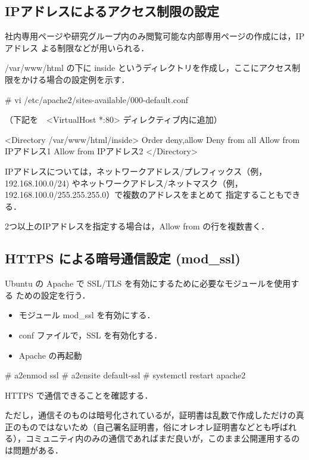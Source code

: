 \subsection{IPアドレスによるアクセス制限の設定}

社内専用ページや研究グループ内のみ閲覧可能な内部専用ページの作成には，IPアドレス
よる制限などが用いられる．

/var/www/html の下に inside というディレクトリを作成し，ここにアクセス制
限をかける場合の設定例を示す．

\begin{cli}
# vi /etc/apache2/sites-available/000-default.conf

（下記を　<VirtualHost *:80> ディレクティブ内に追加）

<Directory /var/www/html/inside>
        Order deny,allow
        Deny from all
        Allow from IPアドレス1
        Allow from IPアドレス2
</Directory>
\end{cli}

IPアドレスについては，ネットワークアドレス/プレフィックス（例，192.168.100.0/24)
やネットワークアドレス/ネットマスク（例，192.168.100.0/255.255.255.0）で複数のアドレスをまとめて
指定することもできる． 

2つ以上のIPアドレスを指定する場合は，Allow from の行を複数書く．




\subsection{HTTPS による暗号通信設定 (mod\_ssl)}

Ubuntu の Apache で SSL/TLS を有効にするために必要なモジュールを使用する
ための設定を行う．

\begin{itemize}
 \item モジュール mod\_ssl を有効にする．
 \item conf ファイルで，SSL を有効化する．
 \item Apache の再起動
\end{itemize}

\begin{cli}
# a2enmod ssl
# a2ensite default-ssl
# systemctl restart apache2
\end{cli}

HTTPS で通信できることを確認する．

ただし，通信そのものは暗号化されているが，証明書は乱数で作成しただけの真正のものではないため（自己署名証明書，俗にオレオレ証明書などとも呼ばれる），コミュニティ内のみの通信であればまだ良いが，このまま公開運用するのは問題がある．

